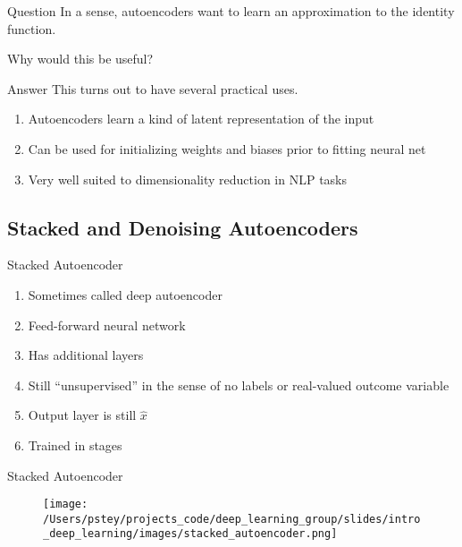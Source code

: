 \documentclass[pdf]{beamer}
\begin{document}
		
		\begin{frame}{Question}
		In a sense, autoencoders want to learn an approximation to the identity function.
			\begin{center}
				Why would this be useful?
			\end{center}
		\end{frame}
		
		\begin{frame}{Answer}
		This turns out to have several practical uses.
		\vspace{2em}
		\begin{enumerate}
			\item Autoencoders learn a kind of latent representation of the input
			\item Can be used for initializing weights and biases prior to fitting neural net
			\item Very well suited to dimensionality reduction in NLP tasks 
		\end{enumerate}
		\end{frame}

	
		

		
\subsection{Stacked and Denoising Autoencoders}
		\begin{frame}{Stacked Autoencoder}
		\begin{enumerate}
			\item Sometimes called deep autoencoder
			\item Feed-forward neural network
			\item Has additional layers 
			\item Still ``unsupervised'' in the sense of no labels or real-valued outcome variable
			\item Output layer is still $\hat{x}$
			\item Trained in stages
		\end{enumerate}
		\end{frame}
		
		\begin{frame}{Stacked Autoencoder}
		\begin{figure}
			\texttt{[image: /Users/pstey/projects\_code/deep\_learning\_group/slides/intro\_deep\_learning/images/stacked\_autoencoder.png]}
		\end{figure}	
		\end{frame}
		
\end{document}
